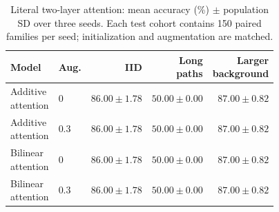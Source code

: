 \begin{table}[tbp]
\centering
\caption{Literal two-layer attention: mean accuracy (\%) $\pm$ population SD over three seeds. Each test cohort contains 150 paired families per seed; initialization and augmentation are matched.}
\label{tab:literal_bilinear}
\evidencetable
\begin{tabular}{llrrr}
\toprule
Model & Aug. & IID & \makecell{Long\\paths} & \makecell{Larger\\background} \\
\midrule
\makecell[l]{Additive\\attention} & 0 & $86.00 \pm 1.78$ & $50.00 \pm 0.00$ & $87.00 \pm 0.82$ \\
\makecell[l]{Additive\\attention} & 0.3 & $86.00 \pm 1.78$ & $50.00 \pm 0.00$ & $87.00 \pm 0.82$ \\
\makecell[l]{Bilinear\\attention} & 0 & $86.00 \pm 1.78$ & $50.00 \pm 0.00$ & $87.00 \pm 0.82$ \\
\makecell[l]{Bilinear\\attention} & 0.3 & $86.00 \pm 1.78$ & $50.00 \pm 0.00$ & $87.00 \pm 0.82$ \\
\bottomrule
\end{tabular}
\end{table}
